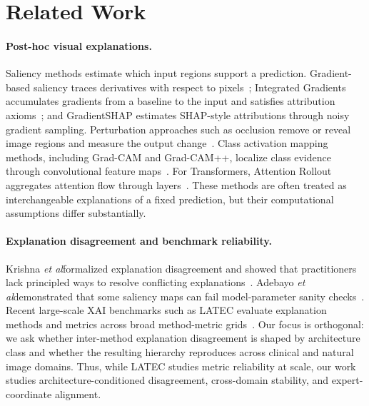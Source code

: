 \documentclass{bmvc2k}
\def\etal{\emph{et al}\bmvaOneDot}
\begin{document}
\section{Related Work}

\paragraph{Post-hoc visual explanations.}
Saliency methods estimate which input regions support a prediction. Gradient-based saliency traces derivatives with respect to pixels~\cite{simonyan2014deep}; Integrated Gradients accumulates gradients from a baseline to the input and satisfies attribution axioms~\cite{sundararajan2017axiomatic}; and GradientSHAP estimates SHAP-style attributions through noisy gradient sampling. Perturbation approaches such as occlusion remove or reveal image regions and measure the output change~\cite{zeiler2014visualizing}. Class activation mapping methods, including Grad-CAM and Grad-CAM++, localize class evidence through convolutional feature maps~\cite{selvaraju2017gradcam,chattopadhay2018gradcampp}. For Transformers, Attention Rollout aggregates attention flow through layers~\cite{abnar2020quantifying}. These methods are often treated as interchangeable explanations of a fixed prediction, but their computational assumptions differ substantially.

\paragraph{Explanation disagreement and benchmark reliability.}
Krishna \etal formalized explanation disagreement and showed that practitioners lack principled ways to resolve conflicting explanations~\cite{krishna2022disagreement}. Adebayo \etal demonstrated that some saliency maps can fail model-parameter sanity checks~\cite{adebayo2018sanity}. Recent large-scale XAI benchmarks such as LATEC evaluate explanation methods and metrics across broad method-metric grids~\cite{hedstrom2024latec}. Our focus is orthogonal: we ask whether inter-method explanation disagreement is shaped by architecture class and whether the resulting hierarchy reproduces across clinical and natural image domains. Thus, while LATEC studies metric reliability at scale, our work studies architecture-conditioned disagreement, cross-domain stability, and expert-coordinate alignment.
\end{document}
